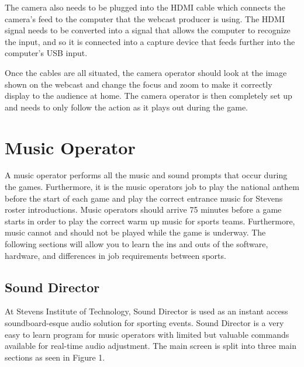 \documentclass{article}
\begin{document}

The camera also needs to be plugged into the HDMI cable which connects the camera’s feed to the computer that the webcast producer is using. The HDMI signal needs to be converted into a signal that allows the computer to recognize the input, and so it is connected into a capture device that feeds further into the computer’s USB input. 


Once the cables are all situated, the camera operator should look at the image shown on the webcast and change the focus and zoom to make it correctly display to the audience at home. The camera operator is then completely set up and needs to only follow the action as it plays out during the game. 




\section{Music Operator}
A music operator performs all the music and sound prompts that occur during the games. Furthermore, it is the music operators job to play the national anthem before the start of each game and play the correct entrance music for Stevens roster introductions. Music operators should arrive 75 minutes before a game starts in order to play the correct warm up music for sports teams. Furthermore, music cannot and should not be played while the game is underway. The following sections will allow you to learn the ins and outs of the software, hardware, and differences in job requirements between sports.

\subsection{Sound Director}
At Stevens Institute of Technology, Sound Director is used as an instant access soundboard-esque audio solution for sporting events. Sound Director is a very easy to learn program for music operators with limited but valuable commands available for real-time audio adjustment. The main screen is split into three main sections as seen in Figure 1. 
\end{document}
